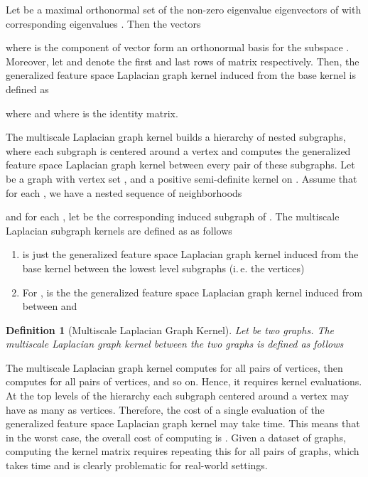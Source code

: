 \documentclass[twoside,11pt]{article}
\newcommand{\ie}{i.\,e. }
\newtheorem{definition}{Definition}
\begin{document}
Let  be a maximal orthonormal set of the non-zero eigenvalue eigenvectors of 
with corresponding eigenvalues .
Then the vectors

where  is the  component of vector  form an orthonormal basis for the subspace .
Moreover, let  and  denote the first  and last  rows of matrix  respectively.
Then, the generalized feature space Laplacian graph kernel induced from the base kernel  is defined as

where  and  where  is the  identity matrix.

The multiscale Laplacian graph kernel builds a hierarchy of nested subgraphs, where each subgraph is centered around a vertex and computes the generalized feature space Laplacian graph kernel between every pair of these subgraphs.
Let  be a graph with vertex set , and  a positive semi-definite kernel on .
Assume that for each , we have a nested sequence of  neighborhoods

and for each , let  be the corresponding induced subgraph of .
The multiscale Laplacian subgraph kernels are defined as  as follows
\begin{enumerate}
    \item  is just the generalized feature space Laplacian graph kernel  induced from the base kernel  between the lowest level subgraphs (\ie the vertices)
    
    \item For ,  is the the generalized feature space Laplacian graph kernel induced from  between  and 
    
\end{enumerate}

\begin{definition}[Multiscale Laplacian Graph Kernel]
	Let  be two graphs.
	The multiscale Laplacian graph kernel between the two graphs is defined as follows
	
\end{definition}
The multiscale Laplacian graph kernel computes  for all pairs of vertices, then computes  for all pairs of vertices, and so on.
Hence, it requires  kernel evaluations.
At the top levels of the hierarchy each subgraph centered around a vertex  may have as many as  vertices.
Therefore, the cost of a single evaluation of the generalized feature space Laplacian graph kernel may take  time.
This means that in the worst case, the overall cost of computing  is .
Given a dataset of  graphs, computing the kernel matrix requires repeating this for all pairs of graphs, which takes  time and is clearly problematic for real-world settings.
\end{document}
